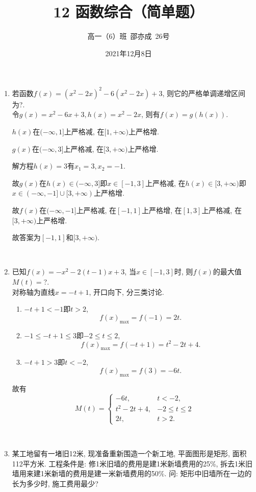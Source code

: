 \documentclass[8pt]{article}
\author{高一（6）班\ 邵亦成\ 26号}
\title{12 函数综合（简单题）}
\date{2021年12月8日}
\begin{document}
	\maketitle

	\begin{enumerate}[label=\arabic*.]
		\item 若函数$f(x)=(x^2-2x)^2-6(x^2-2x)+3$, 则它的严格单调递增区间为?.
			~\\

			令$g(x)=x^2-6x+3, h(x)=x^2-2x$, 则有$f(x)=g(h(x))$.

			$h(x)$在$(-\infty, 1]$上严格减, 在$[1, +\infty)$上严格增.

			$g(x)$在$(-\infty, 3]$上严格减, 在$[3, +\infty)$上严格增.

			解方程$h(x)=3$有$x_1 = 3, x_2 = -1$.

			故$g(x)$在$h(x)\in(-\infty, 3]$即$x\in[-1, 3]$上严格减, 在$h(x)\in[3, +\infty)$即$x\in(-\infty, -1]\cup[3, +\infty)$上严格增.

			故$f(x)$在$(-\infty, -1]$上严格减, 在$[-1, 1]$上严格增, 在$[1, 3]$上严格减, 在$[3, +\infty)$上严格增.

			故答案为$[-1, 1]$和$[3, +\infty)$.

		~\\

		\item 已知$f(x)=-x^2-2(t-1)x+3$, 当$x\in[-1, 3]$时, 则$f(x)$的最大值$M(t)=$?.
			~\\

			对称轴为直线$x=-t+1$, 开口向下, 分三类讨论.

			\begin{enumerate}[label=$\arabic*^{\circ}$]
				\item $-t+1 < -1$即$t>2$, $$f(x)_{\max}=f(-1)=2t.$$
				\item $-1 \leq -t+1 \leq 3$即$-2 \leq t \leq 2$, $$f(x)_{\max}=f(-t+1)=t^2-2t+4.$$
				\item $-t+1 > 3$即$t<-2$, $$f(x)_{\max}=f(3)=-6t.$$
			\end{enumerate}

			故有$$M(t)=\left\{\begin{array}{rl}-6t,&t<-2,\\t^2-2t+4,&-2\leq t\leq 2\\2t,&t>2.\end{array}\right.$$

		~\\

		\item 某工地留有一堵旧12米, 现准备重新围造一个新工地, 平面图形是矩形, 面积112平方米. 工程条件是: 修1米旧墙的费用是建1米新墙费用的25\%, 拆去1米旧墙用来建1米新墙的费用是建一米新墙费用的50\%. 问: 矩形中旧墙所在一边的长为多少时, 施工费用最少?
			~\\


\end{enumerate}
\end{document}
